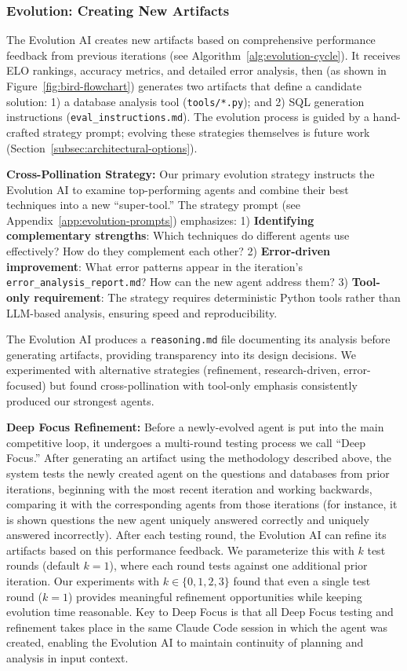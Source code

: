 \documentclass{article}
\begin{document}
\subsubsection{Evolution: Creating New Artifacts}
\label{subsubsec:evolution}

The Evolution AI creates new artifacts based on comprehensive performance feedback from previous iterations (see Algorithm~\ref{alg:evolution-cycle}). It receives ELO rankings, accuracy metrics, and detailed error analysis, then (as shown in Figure~\ref{fig:bird-flowchart}) generates two artifacts that define a candidate solution: 1) a database analysis tool (\texttt{tools/*.py}); and 2) SQL generation instructions (\texttt{eval\_instructions.md}). The evolution process is guided by a hand-crafted strategy prompt; evolving these strategies themselves is future work (Section~\ref{subsec:architectural-options}).

\textbf{Cross-Pollination Strategy:} Our primary evolution strategy instructs the Evolution AI to examine top-performing agents and combine their best techniques into a new ``super-tool.'' The strategy prompt (see Appendix~\ref{app:evolution-prompts}) emphasizes: 1) \textbf{Identifying complementary strengths}: Which techniques do different agents use effectively? How do they complement each other? 2) \textbf{Error-driven improvement}: What error patterns appear in the iteration's \texttt{error\_analysis\_report.md}? How can the new agent address them? 3) \textbf{Tool-only requirement}: The strategy requires deterministic Python tools rather than LLM-based analysis, ensuring speed and reproducibility.

The Evolution AI produces a \texttt{reasoning.md} file documenting its analysis before generating artifacts, providing transparency into its design decisions. We experimented with alternative strategies (refinement, research-driven, error-focused) but found cross-pollination with tool-only emphasis consistently produced our strongest agents.

\textbf{Deep Focus Refinement:} Before a newly-evolved agent is put into the main competitive loop, it undergoes a multi-round testing process we call ``Deep Focus.'' After generating an artifact using the methodology described above, the system tests the newly created agent on the questions and databases from prior iterations, beginning with the most recent iteration and working backwards, comparing it with the corresponding agents from those iterations (for instance, it is shown questions the new agent uniquely answered correctly and uniquely answered incorrectly). After each testing round, the Evolution AI can refine its artifacts based on this performance feedback. We parameterize this with $k$ test rounds (default $k=1$), where each round tests against one additional prior iteration. Our experiments with $k \in \{0, 1, 2, 3\}$ found that even a single test round ($k=1$) provides meaningful refinement opportunities while keeping evolution time reasonable.  Key to Deep Focus is that all Deep Focus testing and refinement takes place in the same Claude Code session in which the agent was created, enabling the Evolution AI to maintain continuity of planning and analysis in input context.
\end{document}
